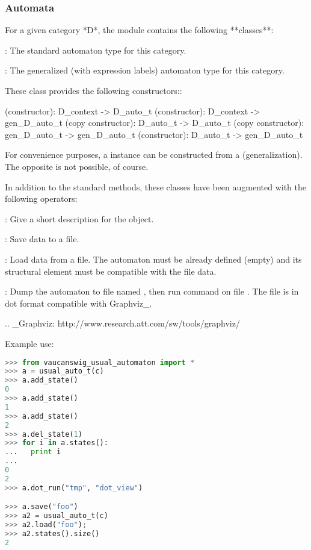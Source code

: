 \subsubsection{Automata}

For  a  given  category  *D*,  the  module  
contains the following **classes**:

: 
  The standard automaton type for this category.

:
  The  generalized (with  expression labels)  automaton type  for this
  category.

These class provides the following constructors::

  (constructor): D\_context -> D\_auto\_t
  (constructor): D\_context -> gen\_D\_auto\_t
  (copy constructor): D\_auto\_t -> D\_auto\_t
  (copy constructor): gen\_D\_auto\_t -> gen\_D\_auto\_t
  (constructor): D\_auto\_t -> gen\_D\_auto\_t

For   convenience  purposes,  a     instance   can  be
constructed from a   (generalization). The opposite is not
possible, of course.

In addition to the standard \Vauc methods, these classes have been
augmented with the following operators:

:
   Give a short description for the object.

:
   Save data to a file.

:
   Load data from a file. The automaton must be already defined (empty)
   and its structural element must be compatible with the file data.

:
   Dump the automaton to file named , then run command 
   on file . The file is in dot format compatible with Graphviz\_.

.. \_Graphviz: http://www.research.att.com/sw/tools/graphviz/

Example use:

\begin{lstlisting}[language=Python]
>>> from vaucanswig_usual_automaton import *
>>> a = usual_auto_t(c)
>>> a.add_state()
0
>>> a.add_state()
1
>>> a.add_state() 
2
>>> a.del_state(1)
>>> for i in a.states():
...   print i
...  
0
2
>>> a.dot_run("tmp", "dot_view")

>>> a.save("foo")
>>> a2 = usual_auto_t(c)
>>> a2.load("foo");
>>> a2.states().size()
2
\end{lstlisting}


